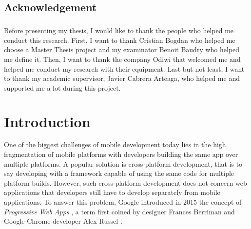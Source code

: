 \documentclass{kththesis}
\begin{document}
\section*{Acknowledgement}
\paragraph{}
Before presenting my thesis, I would like to thank the people who helped me conduct this research. First, I want to thank Cristian Bogdan who helped me choose a Master Thesis project and my examinator Benoit Baudry who helped me define it. 
Then, I want to thank the company Odiwi that welcomed me and helped me conduct my research with their equipment. Last but not least, I want to thank my academic supervisor, Javier Cabrera Arteaga, who helped me and supported me a lot during this project. 

\tableofcontents


\mainmatter


\chapter{Introduction}

\indent 

One of the biggest challenges of mobile development today lies in the high fragmentation of mobile platforms \cite{MobileDevChallenges} with developers building the same app over multiple platforms. A popular solution is cross-platform development, that is to say developing with a framework capable of using the same code for multiple platform builds. However, such cross-platform development does not concern web applications that developers still have to develop separately from mobile applications. To answer this problem, Google introduced in 2015 the concept of \textit{Progressive Web Apps} \cite{PWA_intro}, a term first coined by designer Frances Berriman and Google Chrome developer Alex Russel \cite{PWA_blog, PWApossibleUnifer}.
\end{document}
